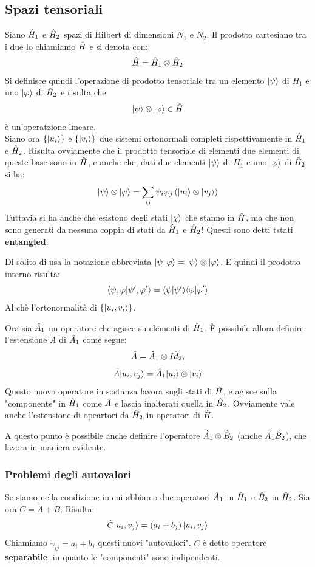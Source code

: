 \subsection{Spazi tensoriali}
Siano $\H_1$ e $\H_2$ spazi di Hilbert di dimensioni $N_1$ e $N_2$. Il prodotto cartesiano tra i due lo chiamiamo $\H$ e si denota con:
\[
	\H = \H_1 \otimes \H_2
\]
Si definisce quindi l'operazione di prodotto tensoriale tra un elemento $\Ket \psi$ di $H_1$ e uno $\Ket \vphi$ di $\H_2$ e risulta che
\[
	\Ket \psi \otimes \Ket \vphi \in \H
\]
è un'operatzione lineare. \\
Siano ora $\{\Ket {u_i}\}$ e $\{\Ket {v_i}\}$ due sistemi ortonormali completi rispettivamente in $\H_1$ e $\H_2$. Risulta ovviamente che il prodotto tensoriale di elementi due elementi di queste base sono in $\H$, e anche che, dati due elementi $\Ket \psi$ di $H_1$ e uno $\Ket \vphi$ di $\H_2$ si ha:
\[
	\Ket \psi \otimes \Ket \vphi = \sum_{ij} \psi_i\vphi_j \left( \Ket {u_i} \otimes \Ket {v_j} \right)
\]
Tuttavia si ha anche che esistono degli stati $\Ket \chi$ che stanno in $\H$, ma che non sono generati da nessuna coppia di stati da $\H_1$ e $\H_2$! Questi sono detti tstati \textbf{entangled}.

Di solito di usa la notazione abbreviata $\Ket {\psi, \vphi} = \Ket \psi \otimes \Ket \vphi$. E quindi il prodotto interno risulta:
\[
	\braket{\psi, \vphi}{\psi', \vphi'} = \braket{\psi}{\psi'} \braket{\vphi}{\vphi'}
\]
Al chè l'ortonormalità di $\{\Ket {u_i, v_i}\}$.

Ora sia $\A_1$ un operatore che agisce su elementi di $\H_1$. È possibile allora definire l'estensione $\tilde A$ di $\A_1$ come segue:
\[
	\tilde A = \A_1 \otimes \hat {Id_2}, \]\[
	\tilde A \Ket {u_i, v_j} = \A_1 \Ket {u_i} \otimes \Ket {v_i}
\]
Questo nuovo operatore in sostanza lavora sugli stati di $\H$, e agisce sulla "componente" in $\H_1$ come $\A$ e lascia inalterati quella in $\H_2$. Ovviamente vale anche l'estensione di opeartori da $\H_2$ in operatori di $\H$.

A questo punto è possibile anche definire l'operatore $\A_1 \otimes \B_2$ (anche $\A_1\B_2$), che lavora in maniera evidente.

\subsubsection*{Problemi degli autovalori}
Se siamo nella condizione in cui abbiamo due operatori $\A_1$ in $\H_1$ e $\B_2$ in $\H_2$. Sia ora $\tilde C = \tilde A + \tilde B$. Risulta:
\[
	\tilde C \Ket {u_i, v_j} = \left( a_i + b_j \right) \Ket {u_i, v_j}
\]
Chiamiamo $\gamma_{ij} = a_i + b_j$ questi nuovi "autovalori". $\tilde C$ è detto operatore \textbf{separabile}, in quanto le "componenti" sono indipendenti.

